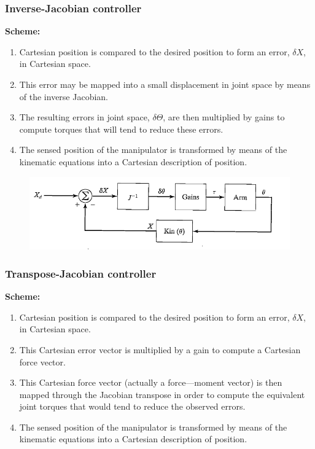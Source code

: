 \documentclass[10pt,a4paper]{article}
\begin{document}
\subsubsection{Inverse-Jacobian controller} 
\textbf{Scheme:}
\begin{enumerate}
	\item Cartesian position is compared to the desired position to form an error, $\delta X$, in Cartesian space.
	\item This error may be mapped into a small displacement in joint space by means of the inverse Jacobian. 
	\item The resulting errors in joint space, $\delta \Theta$, are then multiplied by gains to compute torques that will tend to reduce these errors.
	\item The sensed position of the manipulator is transformed by means of the kinematic equations into a Cartesian description of position.
\end{enumerate}

\begin{figure}[H]
\includegraphics[width=0.5\columnwidth]{imgs/control_cartesian_inverse-jacobian.png}
\end{figure}

\subsubsection{Transpose-Jacobian controller} 
\textbf{Scheme:}
\begin{enumerate}
	\item Cartesian position is compared to the desired position to form an error, $\delta X$, in Cartesian space.
	\item This Cartesian error vector is multiplied by a gain to compute a Cartesian force vector.
	\item This Cartesian force vector (actually a force—moment vector) is then mapped through the Jacobian transpose in order to compute the equivalent joint torques that would tend to reduce the observed errors.
	\item The sensed position of the manipulator is transformed by means of the kinematic equations into a Cartesian description of position.
\end{enumerate}
\end{document}
